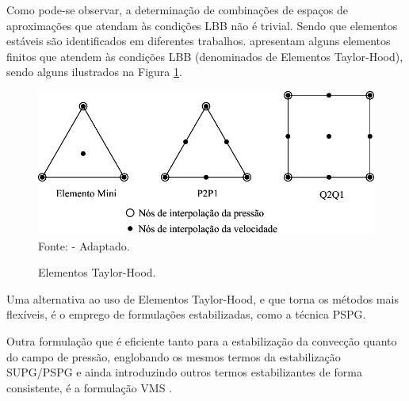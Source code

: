 Como pode-se observar, a determinação de combinações de espaços de aproximações que atendam às condições LBB não é trivial. Sendo que elementos estáveis são identificados em diferentes trabalhos.  apresentam alguns elementos finitos que atendem às condições LBB (denominados de Elementos Taylor-Hood), sendo alguns ilustrados na Figura \ref{fig:Taylor-Hood}.

\begin{figure}[h!]
    \centering
    \caption{Elementos Taylor-Hood.}
    \includegraphics[width=.65\linewidth]{Figuras/Taylor-Hood.pdf}
    \\Fonte:  - Adaptado.
    \label{fig:Taylor-Hood}
\end{figure}

Uma alternativa ao uso de Elementos Taylor-Hood, e que torna os métodos mais flexíveis, é o emprego de formulações estabilizadas, como a técnica PSPG.

Outra formulação que é eficiente tanto para a estabilização da convecção quanto do campo de pressão, englobando os mesmos termos da estabilização SUPG/PSPG e ainda introduzindo outros termos estabilizantes de forma consistente, é a formulação VMS \cite{bazilevs2013computational}.



